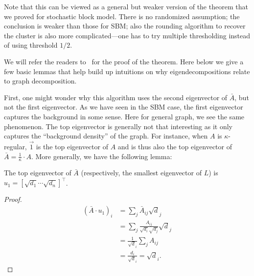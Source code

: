Note that this can be viewed as a general but weaker version of the theorem that we proved for stochastic block model. There is no randomized assumption; the conclusion is weaker than those for SBM; also the rounding algorithm to recover the cluster is also more complicated---one has to try multiple thresholding instead of using threshold $1/2$. 

We will refer the readers to~\citet{chung2007four} for the proof of the theorem. Here below we give a few basic lemmas that help build up intuitions on why eigendecompositions relate to graph decomposition.

First, one might wonder why this algorithm uses the second eigenvector of $\bar{A}$, but not the first eigenvector. As we have seen in the SBM case, the first eigenvector captures the background in some sense. Here for general graph, we see the same phenomenon. The top eigenvector is generally not that interesting as it only captures the ``background density'' of the graph. For instance, when $A$ is $\kappa$-regular, $\vec{1}$ is the top eigenvector of $A$ and is thus also the top eigenvector of $\bar{A} = \frac{1}{\kappa} \cdot A$. More generally, we have the following lemma:


\begin{lemma}
The top eigenvector of $\bar{A}$ (respectively, the smallest eigenvector of $L$) is $u_1 = [\sqrt{d_1} \cdots \sqrt{d_n}]^\top$.	
\end{lemma}
\begin{proof}
\begin{align}
	(\bar{A} \cdot u_1)_i &= \sum_j \bar{A}_{ij} \sqrt{d}_j \\
	&= \sum_j \frac{A_{ij}}{\sqrt{d_i}\sqrt{d_j}} \sqrt{d}_j \\
	&= \frac{1}{\sqrt{d}_i} \sum_j A_{ij} \\
	&= \frac{d_i}{\sqrt{d}_i} = \sqrt{d}_i.
\end{align}
\end{proof}


